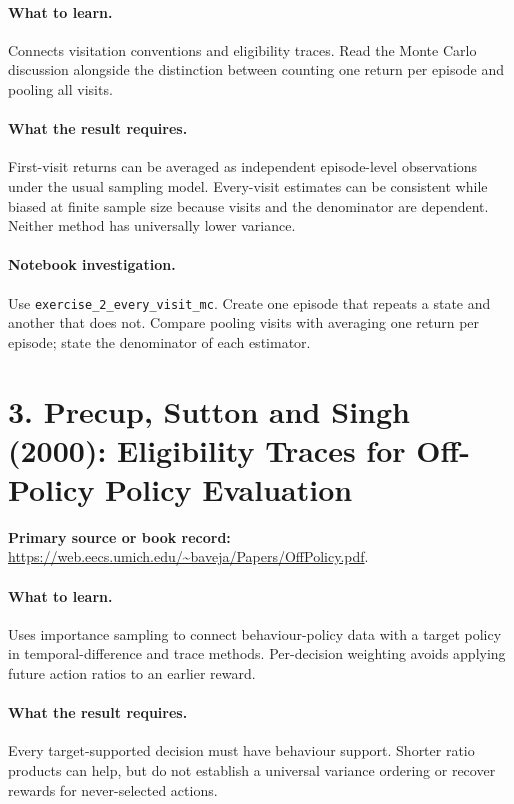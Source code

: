\documentclass[11pt]{scrartcl}
\begin{document}
\paragraph{What to learn.} Connects visitation conventions and eligibility traces. Read the Monte Carlo discussion alongside the distinction between counting one return per episode and pooling all visits.

\paragraph{What the result requires.} First-visit returns can be averaged as independent episode-level observations under the usual sampling model. Every-visit estimates can be consistent while biased at finite sample size because visits and the denominator are dependent. Neither method has universally lower variance.

\paragraph{Notebook investigation.} Use \texttt{exercise\_2\_every\_visit\_mc}. Create one episode that repeats a state and another that does not. Compare pooling visits with averaging one return per episode; state the denominator of each estimator.

\section*{3. Precup, Sutton and Singh (2000): Eligibility Traces for Off-Policy Policy Evaluation}
\textbf{Primary source or book record:} \url{https://web.eecs.umich.edu/~baveja/Papers/OffPolicy.pdf}.

\paragraph{What to learn.} Uses importance sampling to connect behaviour-policy data with a target policy in temporal-difference and trace methods. Per-decision weighting avoids applying future action ratios to an earlier reward.

\paragraph{What the result requires.} Every target-supported decision must have behaviour support. Shorter ratio products can help, but do not establish a universal variance ordering or recover rewards for never-selected actions.
\end{document}
